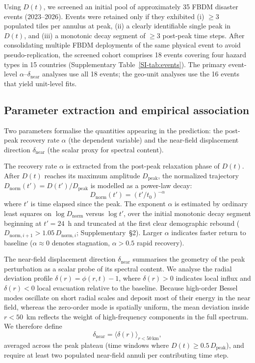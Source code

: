 \documentclass[11pt]{article}
\newcommand{\dnear}{\delta_{\mathrm{near}}}
\newcommand{\dpeak}{D_{\mathrm{peak}}}
\newcommand{\Dnorm}{D_{\mathrm{norm}}}
\begin{document}
Using $D(t)$, we screened an initial pool of approximately 35 FBDM disaster events (2023--2026). Events were retained only if they exhibited (i) $\geq 3$ populated tiles per annulus at peak, (ii) a clearly identifiable single peak in $D(t)$, and (iii) a monotonic decay segment of $\geq 3$ post-peak time steps. After consolidating multiple FBDM deployments of the same physical event to avoid pseudo-replication, the screened cohort comprises 18 events covering four hazard types in 15 countries (Supplementary Table~\ref{SI-tab:events}). The primary event-level $\alpha$--$\dnear$ analyses use all 18 events; the geo-unit analyses use the 16 events that yield unit-level fits.

\subsection*{Parameter extraction and empirical association}

Two parameters formalise the quantities appearing in the prediction: the post-peak recovery rate $\alpha$ (the dependent variable) and the near-field displacement direction $\dnear$ (the scalar proxy for spectral content).

The recovery rate $\alpha$ is extracted from the post-peak relaxation phase of $D(t)$. After $D(t)$ reaches its maximum amplitude $\dpeak$, the normalized trajectory $\Dnorm(t') = D(t')/\dpeak$ is modelled as a power-law decay:
\begin{equation}
  \Dnorm(t') = (t'/t_0)^{-\alpha}
  \label{eq:powerlaw}
\end{equation}
where $t'$ is time elapsed since the peak. The exponent $\alpha$ is estimated by ordinary least squares on $\log\Dnorm$ versus $\log t'$, over the initial monotonic decay segment beginning at $t' = 24$~h and truncated at the first clear demographic rebound ($D_{\mathrm{norm},i+1} > 1.05\,D_{\mathrm{norm},i}$; Supplementary~\S2). Larger $\alpha$ indicates faster return to baseline ($\alpha \approx 0$ denotes stagnation, $\alpha > 0.5$ rapid recovery).

The near-field displacement direction $\dnear$ summarises the geometry of the peak perturbation as a scalar probe of its spectral content. We analyse the radial deviation profile $\delta(r) = \phi(r, t) - 1$, where $\delta(r) > 0$ indicates local influx and $\delta(r) < 0$ local evacuation relative to the baseline. Because high-order Bessel modes oscillate on short radial scales and deposit most of their energy in the near field, whereas the zero-order mode is spatially uniform, the mean deviation inside $r < 50$~km reflects the weight of high-frequency components in the full spectrum. We therefore define
\begin{equation}
  \dnear = \bigl\langle \delta(r) \bigr\rangle_{r < 50\,\mathrm{km}} ,
\end{equation}
averaged across the peak plateau (time windows where $D(t) \geq 0.5\,\dpeak$), and require at least two populated near-field annuli per contributing time step.
\end{document}
